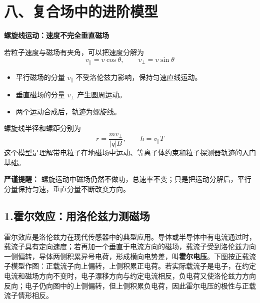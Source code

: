 \section*{八、复合场中的进阶模型}

\begin{competitionbox}
\textbf{螺旋线运动：速度不完全垂直磁场}

若粒子速度与磁场有夹角，可以把速度分解为
\[
v_\parallel = v\cos\theta,\qquad v_\perp = v\sin\theta
\]

\begin{itemize}
  \item 平行磁场的分量 $v_\parallel$ 不受洛伦兹力影响，保持匀速直线运动。
  \item 垂直磁场的分量 $v_\perp$ 产生圆周运动。
  \item 两个运动合成后，轨迹为螺旋线。
\end{itemize}

\begin{center}


\label{fig:helical-motion}
\end{center}

螺旋线半径和螺距分别为
\[
r=\frac{mv_\perp}{|q|B},\qquad h=v_\parallel T
\]
这个模型是理解带电粒子在地磁场中运动、等离子体约束和粒子探测器轨迹的入门基础。

\textbf{严谨提醒：} 螺旋运动中磁场仍然不做功，总速率不变；只是把运动分解后，平行分量保持匀速，垂直分量不断改变方向。
\end{competitionbox}

\subsection*{1.\quad 霍尔效应：用洛伦兹力测磁场}

霍尔效应是洛伦兹力在现代传感器中的典型应用。导体或半导体中有电流通过时，载流子具有定向速度；若再加一个垂直于电流方向的磁场，载流子受到洛伦兹力向一侧偏转，导体两侧积累异号电荷，形成横向电势差，叫\textbf{霍尔电压}。下图按正载流子模型作图：正载流子向上偏转，上侧积累正电荷。若实际载流子是电子，在约定电流和磁场方向不变时，电子漂移方向与约定电流相反，负电荷又使洛伦兹力方向反向；电子仍向图中的上侧偏转，但上侧积累负电荷，因此霍尔电压的极性与正载流子情形相反。

\begin{center}


\label{fig:hall-effect-model}
\end{center}

